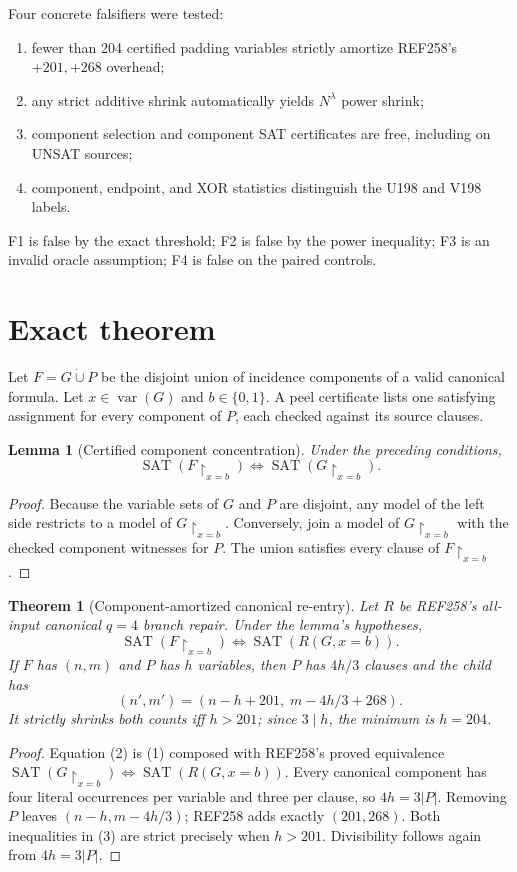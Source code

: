 \documentclass[11pt]{article}
\newtheorem{theorem}{Theorem}
\newtheorem{lemma}{Lemma}
\begin{document}
Four concrete falsifiers were tested:
\begin{enumerate}[label=F\arabic*.]
\item fewer than 204 certified padding variables strictly amortize REF258's $+201,+268$ overhead;
\item any strict additive shrink automatically yields $N^\lambda$ power shrink;
\item component selection and component SAT certificates are free, including on UNSAT sources;
\item component, endpoint, and XOR statistics distinguish the U198 and V198 labels.
\end{enumerate}
F1 is false by the exact threshold; F2 is false by the power inequality; F3 is an invalid oracle assumption; F4 is false on the paired controls.

\section{Exact theorem}
Let $F=G\mathbin{\dot\cup}P$ be the disjoint union of incidence components of a valid canonical formula.  Let $x\in\operatorname{var}(G)$ and $b\in\{0,1\}$.  A peel certificate lists one satisfying assignment for every component of $P$, each checked against its source clauses.

\begin{lemma}[Certified component concentration]
Under the preceding conditions,
\[
 \operatorname{SAT}(F\!\upharpoonright_{x=b})
 \iff \operatorname{SAT}(G\!\upharpoonright_{x=b}).                 \tag{1}
\]
\end{lemma}
\begin{proof}
Because the variable sets of $G$ and $P$ are disjoint, any model of the left side restricts to a model of $G\!\upharpoonright_{x=b}$.  Conversely, join a model of $G\!\upharpoonright_{x=b}$ with the checked component witnesses for $P$.  The union satisfies every clause of $F\!\upharpoonright_{x=b}$.
\end{proof}

\begin{theorem}[Component-amortized canonical re-entry]
Let $R$ be REF258's all-input canonical $q=4$ branch repair.  Under the lemma's hypotheses,
\[
 \operatorname{SAT}(F\!\upharpoonright_{x=b})
 \iff \operatorname{SAT}(R(G,x=b)).                                \tag{2}
\]
If $F$ has $(n,m)$ and $P$ has $h$ variables, then $P$ has $4h/3$ clauses and the child has
\[
 (n',m')=(n-h+201,\;m-4h/3+268).                                    \tag{3}
\]
It strictly shrinks both counts iff $h>201$; since $3\mid h$, the minimum is $h=204$.
\end{theorem}
\begin{proof}
Equation (2) is (1) composed with REF258's proved equivalence
$\operatorname{SAT}(G\!\upharpoonright_{x=b})\iff\operatorname{SAT}(R(G,x=b))$.
Every canonical component has four literal occurrences per variable and three per clause, so $4h=3|P|$.  Removing $P$ leaves $(n-h,m-4h/3)$; REF258 adds exactly $(201,268)$.  Both inequalities in (3) are strict precisely when $h>201$.  Divisibility follows again from $4h=3|P|$.
\end{proof}
\end{document}

